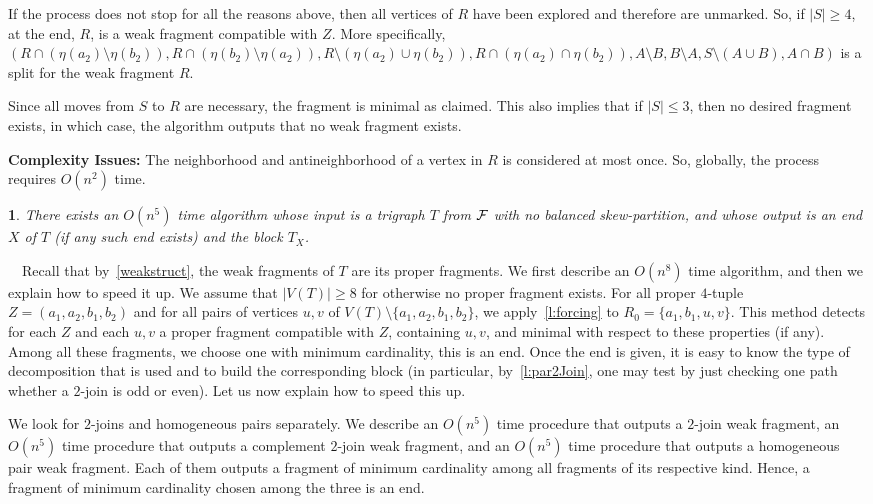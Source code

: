\documentclass[11 pt] {article}
\newcommand\blackslug{\hbox{\hskip 1pt \vrule width 4pt height 8pt depth 1.5pt
        \hskip 1pt}}
\newcommand\bbox{\hfill \quad \blackslug \medbreak}
\newtheorem{theorem}{}[section]
\newcounter{claim}
\newcommand{\Proof}{\setcounter{claim}{0}\noindent{\bf Proof.}\ \ }
\begin{document}
If the process does not stop for all the reasons above, then all
vertices of $R$ have been explored and therefore are unmarked.  So, if
$|S|\geq 4$, at the end, $R$, is a weak fragment compatible with $Z$.
More specifically, $(R \cap (\eta(a_2) \setminus \eta(b_2)), R
\cap(\eta(b_2) \setminus \eta(a_2)), R \setminus (\eta(a_2) \cup
\eta(b_2)), R \cap (\eta(a_2) \cap \eta(b_2)), A \setminus B, B
\setminus A, S \setminus (A \cup B), A \cap B )$ is a split for the
weak fragment $R$.



Since all moves from $S$ to $R$ are necessary, the fragment is minimal
as claimed.  This also implies that if $|S| \leq 3$, then no desired
fragment exists, in which case, the algorithm outputs that no weak
fragment exists.

\noindent\textbf{Complexity Issues:} The neighborhood and
antineighborhood of a vertex in $R$ is considered at most once.  So,
globally, the process requires $O(n^2)$ time.  \bbox


\begin{theorem}
  \label{th:detect}
  There exists an $O(n^5)$ time algorithm whose input is a trigraph
  $T$ from $\cal F$ with no balanced skew-partition, and whose output
  is an end $X$ of $T$ (if any such end exists) and the block $T_X$.
\end{theorem}

\Proof Recall that by~\ref{weakstruct}, the weak fragments of $T$ are
its proper fragments.  We first describe an $O(n^8)$ time algorithm,
and then we explain how to speed it up.  We assume that $|V(T)|\geq 8$
for otherwise no proper fragment exists.  For all proper $4$-tuple $Z
= (a_1, a_2, b_1, b_2)$ and for all pairs of vertices $u, v$ of $V(T)
\setminus \{ a_1,a_2,b_1,b_2\}$, we apply~\ref{l:forcing} to $R_0=\{
a_1, b_1, u, v\}$.  This method detects for each $Z$ and each $u, v$ a
proper fragment compatible with $Z$, containing $u, v$, and minimal
with respect to these properties (if any).  Among all these fragments,
we choose one with minimum cardinality, this is an end.  Once the end is
given, it is easy to know the type of decomposition that is used and
to build the corresponding block (in particular, by~\ref{l:par2Join},
one may test by just checking one path whether a $2$-join is odd or
even).  Let us now explain how to speed this up.

We look for $2$-joins and homogeneous pairs separately.  We describe
an $O(n^5)$ time procedure that outputs a $2$-join weak fragment, an
$O(n^5)$ time procedure that outputs a complement $2$-join weak
fragment, and an $O(n^5)$ time procedure that outputs a homogeneous
pair weak fragment.  Each of them outputs a fragment of minimum
cardinality among all fragments of its respective kind.  Hence, a
fragment of minimum cardinality chosen among the three is an end.
\end{document}
